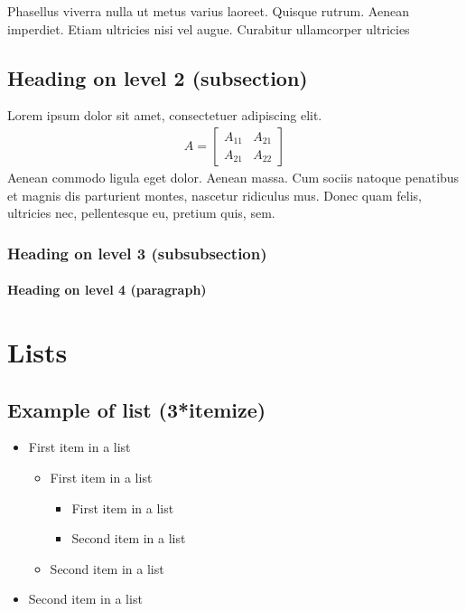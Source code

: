 \documentclass{article}
\numberwithin{equation}{section} %
\numberwithin{figure}{section} %
\numberwithin{table}{section} %
\begin{document}
Phasellus viverra nulla ut metus varius laoreet. Quisque rutrum. Aenean imperdiet. Etiam ultricies nisi vel augue. Curabitur ullamcorper ultricies


\subsection{Heading on level 2 (subsection)}

Lorem ipsum dolor sit amet, consectetuer adipiscing elit. 
\begin{align}
A = 
\begin{bmatrix}
A_{11} & A_{21} \\
A_{21} & A_{22}
\end{bmatrix}
\end{align}
Aenean commodo ligula eget dolor. Aenean massa. Cum sociis natoque penatibus et magnis dis parturient montes, nascetur ridiculus mus. Donec quam felis, ultricies nec, pellentesque eu, pretium quis, sem.


\subsubsection{Heading on level 3 (subsubsection)}

\lipsum[3] %

\paragraph{Heading on level 4 (paragraph)}

\lipsum[6] %


\section{Lists}


\subsection{Example of list (3*itemize)}
\begin{itemize}
	\item First item in a list 
		\begin{itemize}
		\item First item in a list 
			\begin{itemize}
			\item First item in a list 
			\item Second item in a list 
			\end{itemize}
		\item Second item in a list 
		\end{itemize}
	\item Second item in a list 
\end{itemize}
\end{document}
